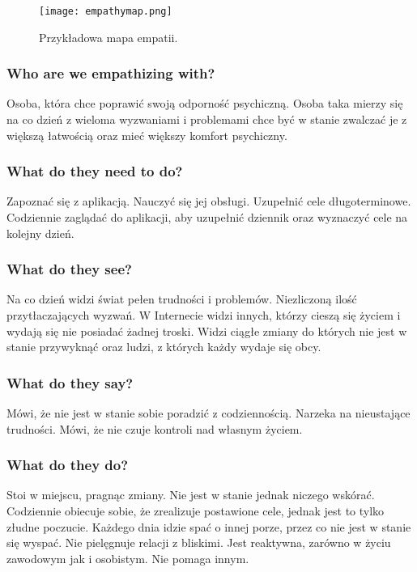\documentclass[12pt, letterpaper]{article}
\begin{document}
    \begin{figure}[h]
        \centering
        \texttt{[image: empathymap.png]}
        \caption{Przykładowa mapa empatii.}
    \end{figure}

    \pagebreak

    \subsubsection*{Who are we empathizing with?}
    Osoba, która chce poprawić swoją odporność psychiczną. Osoba taka mierzy się na co 
    dzień z wieloma wyzwaniami i problemami chce być w stanie zwalczać je z większą 
    łatwością oraz mieć większy komfort psychiczny.

    \subsubsection*{What do they need to do?}
    Zapoznać się z aplikacją. Nauczyć się jej obsługi. Uzupełnić cele długoterminowe.
    Codziennie zaglądać do aplikacji, aby uzupełnić dziennik oraz wyznaczyć cele na kolejny dzień. 

    \subsubsection*{What do they see?}
    Na co dzień widzi świat pełen trudności i problemów. Niezliczoną ilość przytłaczających 
    wyzwań. W Internecie widzi innych, którzy cieszą się życiem i wydają się nie posiadać 
    żadnej troski. Widzi ciągłe zmiany do których nie jest w stanie przywyknąć oraz ludzi, 
    z których każdy wydaje się obcy.

    \subsubsection*{What do they say?}
    Mówi, że nie jest w stanie sobie poradzić z codziennością. Narzeka na nieustające trudności. 
    Mówi, że nie czuje kontroli nad własnym życiem.

    \subsubsection*{What do they do?}
    Stoi w miejscu, pragnąc zmiany. Nie jest w stanie jednak niczego wskórać. Codziennie 
    obiecuje sobie, że zrealizuje postawione cele, jednak jest to tylko złudne poczucie. 
    Każdego dnia idzie spać o innej porze, przez co nie jest w stanie się wyspać. 
    Nie pielęgnuje relacji z bliskimi. Jest reaktywna, zarówno w życiu zawodowym 
    jak i osobistym. Nie pomaga innym.
\end{document}
